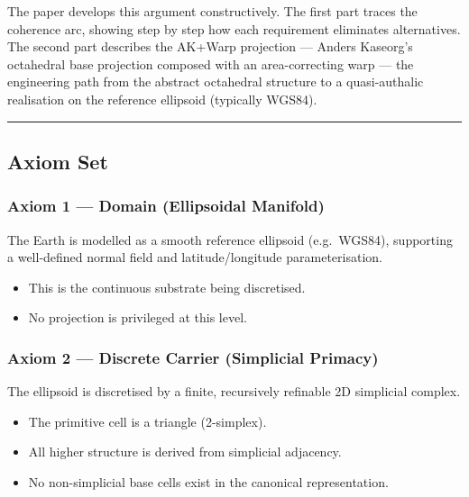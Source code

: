 \documentclass[
  11pt,
  a4paper,
]{article}
\providecommand{\tightlist}{%
  \setlength{\itemsep}{0pt}\setlength{\parskip}{0pt}}
\begin{document}
The paper develops this argument constructively. The first part traces
the coherence arc, showing step by step how each requirement eliminates
alternatives. The second part describes the AK+Warp projection ---
Anders Kaseorg's octahedral base projection composed with an
area-correcting warp --- the engineering path from the abstract
octahedral structure to a quasi-authalic realisation on the reference
ellipsoid (typically WGS84).

\begin{center}\rule{0.5\linewidth}{0.5pt}\end{center}

\subsection{Axiom Set}\label{axiom-set}

\subsubsection{Axiom 1 --- Domain (Ellipsoidal
Manifold)}\label{axiom-1-domain-ellipsoidal-manifold}

The Earth is modelled as a smooth reference ellipsoid (e.g.~WGS84),
supporting a well-defined normal field and latitude/longitude
parameterisation.

\begin{itemize}
\tightlist
\item
  This is the continuous substrate being discretised.
\item
  No projection is privileged at this level.
\end{itemize}

\subsubsection{Axiom 2 --- Discrete Carrier (Simplicial
Primacy)}\label{axiom-2-discrete-carrier-simplicial-primacy}

The ellipsoid is discretised by a finite, recursively refinable 2D
simplicial complex.

\begin{itemize}
\tightlist
\item
  The primitive cell is a triangle (2-simplex).
\item
  All higher structure is derived from simplicial adjacency.
\item
  No non-simplicial base cells exist in the canonical representation.
\end{itemize}
\end{document}
